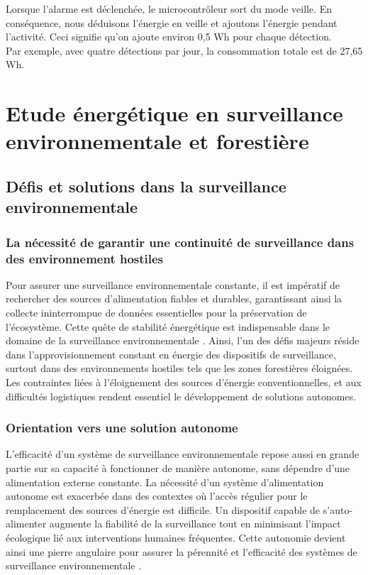 Lorsque l'alarme est déclenchée, le microcontrôleur sort du mode veille. En conséquence, nous déduisons l'énergie en veille et ajoutons l'énergie pendant l'activité. Ceci signifie qu’on ajoute environ 0,5 Wh pour chaque détection.
\\
Par exemple, avec quatre détections par jour, la consommation totale est de 27,65 Wh.

\section{Etude énergétique en surveillance environnementale et forestière}
\subsection{Défis et solutions dans la surveillance environnementale}
\subsubsection{La nécessité de garantir une continuité de surveillance dans des environnement hostiles}
Pour assurer une surveillance environnementale constante, il est impératif de rechercher des sources d'alimentation fiables et durables, garantissant ainsi la collecte ininterrompue de données essentielles pour la préservation de l'écosystème. Cette quête de stabilité énergétique est indispensable dans le domaine de la surveillance environnementale \cite{63}. Ainsi, l'un des défis majeurs réside dans l'approvisionnement constant en énergie des dispositifs de surveillance, surtout dans des environnements hostiles tels que les zones forestières éloignées. Les contraintes liées à l'éloignement des sources d'énergie conventionnelles, et aux difficultés logistiques rendent essentiel le développement de solutions autonomes.

\subsubsection{Orientation vers une solution autonome}
L'efficacité d'un système de surveillance environnementale repose aussi en grande partie sur sa capacité à fonctionner de manière autonome, sans dépendre d'une alimentation externe constante. La nécessité d'un système d'alimentation autonome est exacerbée dans des contextes où l'accès régulier pour le remplacement des sources d'énergie est difficile. Un dispositif capable de s'auto-alimenter augmente la fiabilité de la surveillance tout en minimisant l'impact écologique lié aux interventions humaines fréquentes. Cette autonomie devient ainsi une pierre angulaire pour assurer la pérennité et l'efficacité des systèmes de surveillance environnementale \cite{58}.

